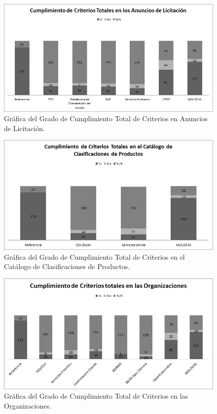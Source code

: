 \begin{figure}[!htb]
\centering
	\includegraphics[width=12cm]{./images/phd/experimentation/criterios-total-ppn}
\caption{Gráfica del Grado de Cumplimiento Total de Criterios en Anuncios de Licitación.}
\label{fig:eval-criteria-1-ppn}
\end{figure}

\begin{figure}[!htb]
\centering
	\includegraphics[width=12cm]{./images/phd/experimentation/criterios-total-pscs}
\caption{Gráfica del Grado de Cumplimiento Total de Criterios en el Catálogo de Clasificaciones de Productos.}
\label{fig:eval-criteria-1-pscs}
\end{figure}

\begin{figure}[!htb]
\centering
	\includegraphics[width=12cm]{./images/phd/experimentation/criterios-total-orgs}
\caption{Gráfica del Grado de Cumplimiento Total de Criterios en las Organizaciones.}
\label{fig:eval-criteria-1-orgs}
\end{figure}


